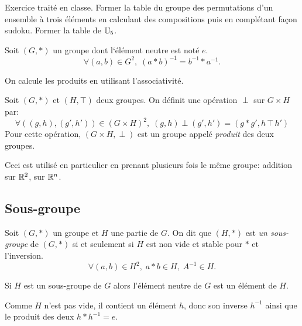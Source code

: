 Exercice traité en classe. Former la table du groupe des permutations d'un ensemble à trois éléments en calculant des compositions puis en complétant façon sudoku. Former la table de $\mathbb{U}_5$.
\begin{prop}
 Soit $(G,*)$ un groupe dont l`élément neutre est noté $e$.
\begin{displaymath}
 \forall (a,b)\in G^2,\; (a*b)^{-1} = b^{-1}* a^{-1}.
\end{displaymath}
\end{prop}
\begin{demo}
 On calcule les produits en utilisant l'associativité.
\end{demo}
\begin{propdef}
 Soit $(G,*)$ et $(H,\intercal)$ deux groupes. On définit une opération $\perp$ sur $G\times H$ par:
\begin{displaymath}
 \forall ((g,h),(g',h'))\in (G\times H)^2,\;(g,h)\perp (g',h')=(g*g',h\intercal h')
\end{displaymath}
Pour cette opération, $(G\times H,\perp)$ est un groupe appelé \emph{produit} des deux groupes.
\end{propdef}
Ceci est utilisé en particulier en prenant plusieurs fois le même groupe: addition sur $\mathbb{R}^2$, sur $\mathbb{R}^n$.

\subsection{Sous-groupe}
\begin{defi}
 Soit $(G,*)$ un groupe et $H$ une partie de $G$. On dit que $(H,*)$ est \emph{un sous-groupe} de $(G,*)$ si et seulement si $H$ est non vide et stable pour $*$ et l'inversion.
\begin{displaymath}
 \forall (a,b)\in H^2,\; a*b \in H, \; A^{-1}\in H .
 \end{displaymath}
\end{defi}
\begin{prop}
  Si $H$ est un sous-groupe de $G$ alors l'élément neutre de $G$ est un élément de $H$.
\end{prop}
\begin{demo}
  Comme $H$ n'est pas vide, il contient un élément $h$, donc son inverse $h^{-1}$ ainsi que le produit des deux $h*h^{-1}=e$.
\end{demo}

